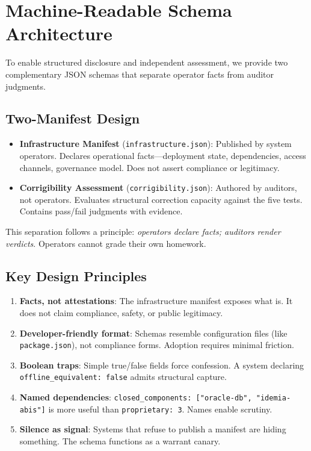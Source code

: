 \documentclass[11pt,a4paper]{article}
\begin{document}
\appendix

\section{Machine-Readable Schema Architecture}
\label{appendix:manifest}

To enable structured disclosure and independent assessment, we provide two complementary JSON schemas that separate operator facts from auditor judgments.

\subsection{Two-Manifest Design}

\begin{itemize}
    \item \textbf{Infrastructure Manifest} (\texttt{infrastructure.json}): Published by system operators. Declares operational facts---deployment state, dependencies, access channels, governance model. Does not assert compliance or legitimacy.
    \item \textbf{Corrigibility Assessment} (\texttt{corrigibility.json}): Authored by auditors, not operators. Evaluates structural correction capacity against the five tests. Contains pass/fail judgments with evidence.
\end{itemize}

This separation follows a principle: \textit{operators declare facts; auditors render verdicts}. Operators cannot grade their own homework.

\subsection{Key Design Principles}

\begin{enumerate}
    \item \textbf{Facts, not attestations}: The infrastructure manifest exposes what is. It does not claim compliance, safety, or public legitimacy.
    \item \textbf{Developer-friendly format}: Schemas resemble configuration files (like \texttt{package.json}), not compliance forms. Adoption requires minimal friction.
    \item \textbf{Boolean traps}: Simple true/false fields force confession. A system declaring \texttt{offline\_equivalent: false} admits structural capture.
    \item \textbf{Named dependencies}: \texttt{closed\_components: ["oracle-db", "idemia-abis"]} is more useful than \texttt{proprietary: 3}. Names enable scrutiny.
    \item \textbf{Silence as signal}: Systems that refuse to publish a manifest are hiding something. The schema functions as a warrant canary.
\end{enumerate}
\end{document}

